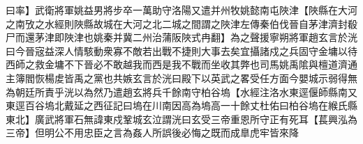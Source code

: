 曰率】武衛將軍姚益男將步卒一萬助守洛陽又遣并州牧姚懿南屯陜津【陜縣在大河之南攷之水經則陜縣故城在大河之北二城之間謂之陜津左傳秦伯伐晉自茅津濟封殽尸而還茅津即陜津也姚秦并冀二州治蒲阪陜式冉翻】為之聲援寧朔將軍趙玄言於洸曰今晉宼益深人情駭動衆寡不敵若出戰不捷則大事去矣宜攝諸戍之兵固守金墉以待西師之救金墉不下晉必不敢越我而西是我不戰而坐收其弊也司馬姚禹隂與檀道濟通主簿閻恢楊䖍皆禹之黨也共嫉玄言於洸曰殿下以英武之畧受任方面今嬰城示弱得無為朝廷所責乎洸以為然乃遣趙玄將兵千餘南守柏谷塢【水經注洛水東逕偃師縣南又東逕百谷塢北戴延之西征記曰塢在川南因高為塢高一十餘丈杜佑曰柏谷塢在緱氏縣東北】廣武將軍石無諱東戍鞏城玄泣謂洸曰玄受三帝重恩所守正有死耳【萇興泓為三帝】但明公不用忠臣之言為姦人所誤後必悔之既而成臯虎牢皆來降